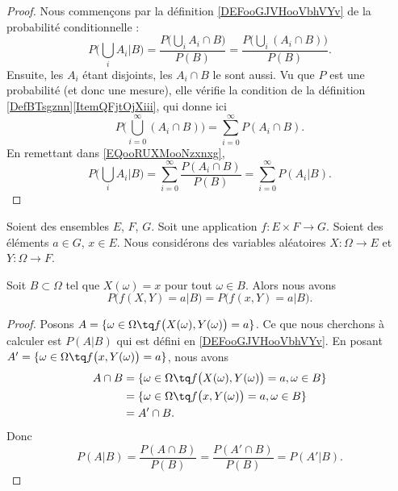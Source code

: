 \begin{proof}
	Nous commençons par la définition \ref{DEFooGJVHooVbhVYv} de la probabilité conditionnelle :
	\begin{equation}        \label{EQooRUXMooNzxnxg}
		P\big( \bigcup_iA_i|B \big)=\frac{ P\big( \bigcup_iA_i\cap B \big) }{ P(B) }=\frac{ P\big( \bigcup_i(A_i\cap B) \big) }{ P(B) }.
	\end{equation}
	Ensuite, les \( A_i\) étant disjoints, les \( A_i\cap B\) le sont aussi. Vu que \( P\) est une probabilité (et donc une mesure), elle vérifie la condition de la définition \ref{DefBTsgznn}\ref{ItemQFjtOjXiii}, qui donne ici
	\begin{equation}
		P\big( \bigcup_{i=0}^{\infty}(A_i\cap B) \big)=\sum_{i=0}^{\infty}P(A_i\cap B).
	\end{equation}
	En remettant dans \eqref{EQooRUXMooNzxnxg},
	\begin{equation}
		P\big( \bigcup_iA_i|B \big)=\sum_{i=0}^{\infty}\frac{ P(A_i\cap B) }{ P(B) }=\sum_{i=0}^{\infty}P(A_i|B).
	\end{equation}
\end{proof}

\begin{lemma}       \label{LEMooVYDTooGELPRY}
	Soient des ensembles \( E\), \( F\), \( G\). Soit une application \( f\colon E\times F\to G\). Soient des éléments \( a\in G\), \( x\in E\). Nous considérons des variables aléatoires \( X\colon \Omega\to E\) et \( Y\colon \Omega\to F\).

	Soit \( B\subset \Omega\) tel que \( X(\omega)=x\) pour tout \( \omega\in B\). Alors nous avons
	\begin{equation}
		P\big( f(X,Y)=a|B \big)=P\big( f(x,Y)=a|B \big).
	\end{equation}
\end{lemma}

\begin{proof}
	Posons \( A=\{ \omega\in \Omega\tq f\big( X(\omega),Y(\omega) \big)=a \}\). Ce que nous cherchons à calculer est \( P(A|B)\) qui est défini en \ref{DEFooGJVHooVbhVYv}. En posant \(  A'=\{ \omega\in\Omega\tq f\big( x,Y(\omega) \big)=a \} \),  nous avons
	\begin{subequations}
		\begin{align}
			A\cap B & =\{ \omega\in \Omega\tq f\big( X(\omega),Y(\omega) \big)=a, \omega\in B \} \\
			        & =\{ \omega\in\Omega\tq f\big( x,Y(\omega) \big)=a,\omega\in B \}           \\
			        & =A'\cap B.
		\end{align}
	\end{subequations}
	Donc
	\begin{equation}
		P(A|B)=\frac{ P(A\cap B) }{ P(B) }=\frac{ P(A'\cap B) }{ P(B) }=P(A'|B).
	\end{equation}
\end{proof}

